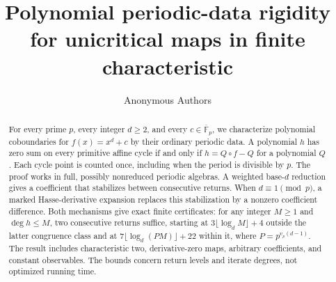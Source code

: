 \documentclass[11pt]{article}
\title{Polynomial periodic-data rigidity for unicritical maps in finite characteristic}
\author{Anonymous Authors}
\date{}
\begin{document}
\maketitle
\begin{abstract}
For every prime $p$, every integer $d\ge2$, and every
$c\in\overline{\mathbb F}_p$, we characterize polynomial coboundaries
for $f(x)=x^d+c$ by their ordinary periodic data. A polynomial $h$ has
zero sum on every primitive affine cycle if and only if
$h=Q\circ f-Q$ for a polynomial $Q$. Each cycle point is counted once,
including when the period is divisible by $p$. The proof works in full,
possibly nonreduced periodic algebras. A weighted base-$d$ reduction
gives a coefficient that stabilizes between consecutive returns. When
$d\equiv1\pmod p$, a marked Hasse-derivative expansion replaces this
stabilization by a nonzero coefficient difference. Both mechanisms give
exact finite certificates: for any integer $M\ge1$ and $\deg h\le M$,
two consecutive returns
suffice, starting at $3\lfloor\log_d M\rfloor+4$ outside the latter
congruence class and at $7\lfloor\log_d(PM)\rfloor+22$ within it,
where $P=p^{v_p(d-1)}$. The result includes characteristic two,
derivative-zero maps, arbitrary coefficients, and constant observables.
The bounds concern return levels and iterate degrees, not optimized
running time.
\end{abstract}









\end{document}
